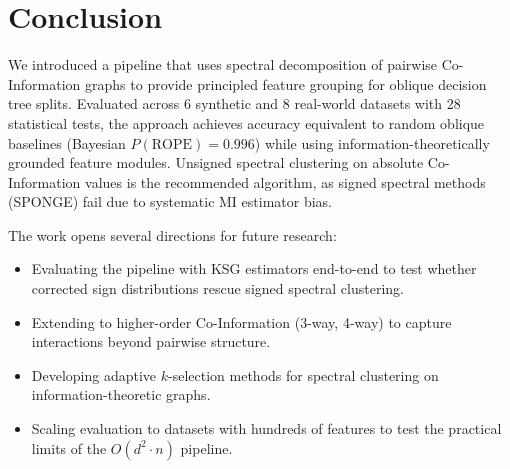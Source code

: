 \documentclass[11pt,letterpaper]{article}
\begin{document}
\section{Conclusion}
\label{sec:conclusion}

We introduced a pipeline that uses spectral decomposition of pairwise Co-Information graphs to provide principled feature grouping for oblique decision tree splits. Evaluated across 6 synthetic and 8 real-world datasets with 28 statistical tests, the approach achieves accuracy equivalent to random oblique baselines (Bayesian $P(\text{ROPE}) = 0.996$) while using information-theoretically grounded feature modules. Unsigned spectral clustering on absolute Co-Information values is the recommended algorithm, as signed spectral methods (SPONGE) fail due to systematic MI estimator bias.

The work opens several directions for future research:
\begin{itemize}
  \item Evaluating the pipeline with KSG estimators end-to-end to test whether corrected sign distributions rescue signed spectral clustering.
  \item Extending to higher-order Co-Information (3-way, 4-way) to capture interactions beyond pairwise structure.
  \item Developing adaptive $k$-selection methods for spectral clustering on information-theoretic graphs.
  \item Scaling evaluation to datasets with hundreds of features to test the practical limits of the $O(d^2 \cdot n)$ pipeline.
\end{itemize}



\end{document}
